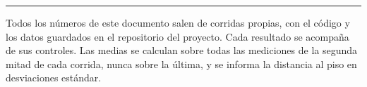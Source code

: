 \documentclass[11pt,a4paper]{article}
\begin{document}
\vspace{10pt}
\hrule
\vspace{8pt}
{\footnotesize\color{tinta2}\sffamily
Todos los números de este documento salen de corridas propias, con el código y los datos guardados
en el repositorio del proyecto. Cada resultado se acompaña de sus controles. Las medias se calculan
sobre todas las mediciones de la segunda mitad de cada corrida, nunca sobre la última, y se informa
la distancia al piso en desviaciones estándar.}
\end{document}
